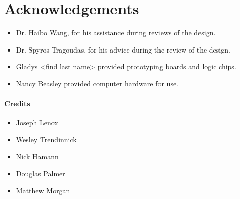 \section{Acknowledgements}
\begin{itemize}
\item Dr. Haibo Wang, for his assistance during reviews of the design. 
\item Dr. Spyros Tragoudas, for his advice during the review of the design.
\item Gladys <find last name> provided prototyping boards and logic chips.
\item Nancy Beasley provided computer hardware for use.
\end{itemize}

\paragraph{Credits}
\begin{itemize}
\item Joseph Lenox
\item Wesley Trendinnick
\item Nick Hamann
\item Douglas Palmer
\item Matthew Morgan
\end{itemize}
